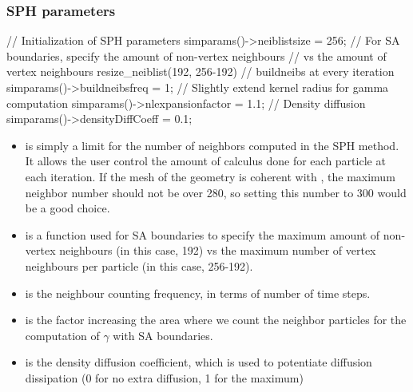 \documentclass{../GPUSPHtemplate}
\begin{document}
\subsubsection{SPH parameters}
\begin{ccode}
// Initialization of SPH parameters
simparams()->neiblistsize = 256;
// For SA boundaries, specify the amount of non-vertex neighbours
// vs the amount of vertex neighbours
resize_neiblist(192, 256-192)
// buildneibs at every iteration
simparams()->buildneibsfreq = 1;
// Slightly extend kernel radius for gamma computation
simparams()->nlexpansionfactor = 1.1;
// Density diffusion
simparams()->densityDiffCoeff = 0.1;
\end{ccode}
\begin{itemize}
\item {} is simply a limit for the number of neighbors computed 
in the SPH method. It allows the user control the amount of calculus 
done for each particle at each iteration. If the mesh of the geometry 
is coherent with , the maximum neighbor number should not be over 280, 
so setting this number to 300 would be a good choice.
\item {} is a function used for SA boundaries to specify the maximum amount
  of non-vertex neighbours (in this case, 192) vs the maximum number of vertex neighbours per particle
  (in this case, 256-192).
\item {} is the neighbour counting frequency, 
in terms of number of time steps.
\item {} is the factor increasing the area 
where we count the neighbor particles
for the computation of $\gamma$ with SA boundaries.
\item {} is the density diffusion coefficient, which is used 
to potentiate diffusion dissipation (0 for no extra diffusion, 1 for the maximum)
\end{itemize}
\end{document}
